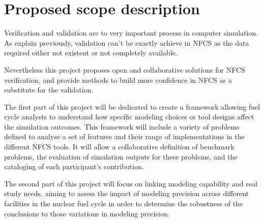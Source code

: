 \section{Proposed scope description}

Verification and validation are to very important process in computer
simulation. As explain previously, validation can't be exactly achieve in NFCS
as the data required either not existent or not completely available. 

Nevertheless this project proposes open and collaborative solutions for
NFCS verification, and provide methods to build more confidence in NFCS as a
substitute for the validation.

The first part of this project will be dedicated to create a framework allowing
fuel cycle analysts to understand how specific modeling choices or tool designs
affect the simulation outcomes. This framework will include a variety of
problems defined to analyse a set of features and their range of implementations
in the different NFCS tools. It will allow a collaborative definition of
benchmark problems, the evaluation of simulation outputs for these problems, and
the cataloging of each participant’s contribution. 

The second part of this project will focus on linking modeling capability and
real study needs, aiming to assess the impact of modeling precision across
different facilities in the nuclear fuel cycle in order to determine the
robustness of the conclusions to those variations in modeling precision. 






